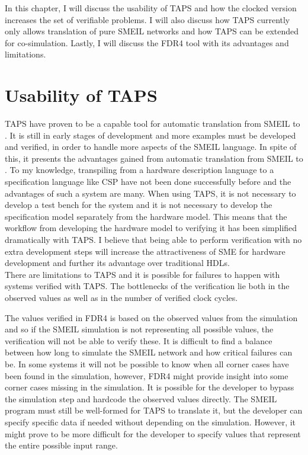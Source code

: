 In this chapter, I will discuss the usability of TAPS and how the clocked version increases the set of verifiable problems. I will also discuss how TAPS currently only allows translation of pure SMEIL networks and how TAPS can be extended for co-simulation. Lastly, I will discuss the FDR4 tool with its advantages and limitations.
\section{Usability of TAPS}
TAPS have proven to be a capable tool for automatic translation from SMEIL to \cspm{}. It is still in early stages of development and more examples must be developed and verified, in order to handle more aspects of the SMEIL language. In spite of this, it presents the advantages gained from automatic translation from SMEIL to \cspm{}. To my knowledge, transpiling from a hardware description language to a specification language like CSP have not been done successfully before and the advantages of such a system are many. When using TAPS, it is not necessary to develop a test bench for the system and it is not necessary to develop the specification model separately from the hardware model. This means that the workflow from developing the hardware model to verifying it has been simplified dramatically with TAPS. I believe that being able to perform verification with no extra development steps will increase the attractiveness of SME for hardware development and further its advantage over traditional HDLs.\\

There are limitations to TAPS and it is possible for failures to happen with systems verified with TAPS. The bottlenecks of the verification lie both in the observed values as well as in the number of verified clock cycles.

The values verified in FDR4 is based on the observed values from the simulation and so if the SMEIL simulation is not representing all possible values, the verification will not be able to verify these.
It is difficult to find a balance between how long to simulate the SMEIL network and how critical failures can be. In some systems it will not be possible to know when all corner cases have been found in the simulation, however, FDR4 might provide insight into some corner cases missing in the simulation.
It is possible for the developer to bypass the simulation step and hardcode the observed values directly. The SMEIL program must still be well-formed for TAPS to translate it, but the developer can specify specific data if needed without depending on the simulation. However, it might prove to be more difficult for the developer to specify values that represent the entire possible input range.\\

